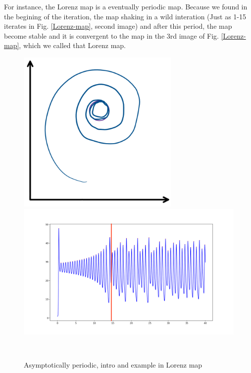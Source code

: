 \documentclass[12pt]{article}
\theoremstyle{plain}
\begin{document}
For instance, the Lorenz map is a eventually periodic map. Because we found in the begining of the iteration, the map shaking in a wild interation (Just as 1-15 iterates in Fig. \ref{Lorenz-map}, second image) and after this period, the map become stable and it is convergent to the map in the 3rd image of Fig. \ref{Lorenz-map}, which we called that Lorenz map.\\[4ex]


\begin{figure}[H]
\begin{minipage}[c][0.29\width]{0.29\textwidth}
   \centering
   \includegraphics[width=0.7\textwidth]{figure/section3/asymptotically-periodic.png}
\end{minipage}
\begin{minipage}[c][0.4\width]{0.4\textwidth}
   \centering
   \includegraphics[width=\textwidth]{figure/section3/Lorenz-map.png}
\end{minipage}
\\[3ex]\caption{Asymptotically periodic, intro and example in Lorenz map}\label{Asymptotically-periodic}
\end{figure}
\end{document}
